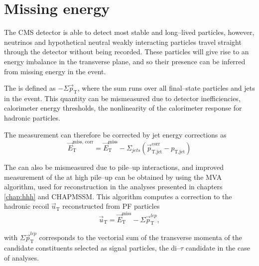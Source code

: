 \section{Missing energy}
\label{sec:objects_met}
The \ac{CMS} detector is able to detect most stable and long--lived particles,
however, neutrinos and hypothetical neutral weakly interacting particles
travel straight through the detector without being recorded. These particles
will give rise to an energy imbalance in the transverse plane, and so their
presence can be inferred from missing energy \MET in the event. 

The \MET is defined as $-\Sigma \vec{p}_{\text{T}}$, where
the sum runs over all final--state particles and jets in the event. This quantity
can be mismeasured due to detector inefficiencies, calorimeter energy thresholds,
the nonlinearity of the calorimeter
response for hadronic particles.


The \MET measurement can therefore be corrected by jet energy corrections as
\begin{equation}\label{eqn:objects_met_corr}
\vec{E}_{\text{T}}^{\text{miss, corr}} = \vec{E}_{\text{T}}^{\text{miss}} - \Sigma_{jets} (\vec{p}_{\text{T,jet}}^{\text{corr}} - p_{\text{T,jet}})
\end{equation}

The \MET can also be mismeasured due to pile--up interactions, and improved
measurement of the \MET at high pile--up can be obtained by using the MVA \MET
algorithm, used for \MET reconstruction in the analyses presented in chapters \ref{chap:hhh} and 
CHAPMSSM. This algorithm computes a correction to the hadronic
recoil $\vec{u}_{\text{T}}$ reconstructed from \ac{PF} particles
\begin{equation}\label{eqn:objects_met_recoil}
\vec{u}_{\text{T}} = \vec{E}_{\text{T}}^{\text{miss}} - \Sigma \vec{p}_{\text{T}}^{lep},
\end{equation}

with $\Sigma \vec{p}_{\text{T}}^{lep}$ corresponds to the vectorial sum of the transverse momenta of the
candidate constituents selected as signal particles, the di--$\tau$ candidate in the case of \htotautau
analyses.

